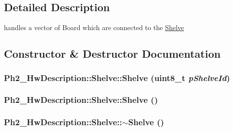 \subsection{Detailed Description}
handles a vector of Board which are connected to the \hyperlink{class_ph2___hw_description_1_1_shelve}{Shelve} 



\subsection{Constructor \& Destructor Documentation}
\hypertarget{class_ph2___hw_description_1_1_shelve_7e0361665ca7e4de8ce3fd1138ad1d86}{
\subsubsection[Shelve]{\setlength{\rightskip}{0pt plus 5cm}Ph2\_\-Hw\-Description::Shelve::Shelve (uint8\_\-t {\em p\-Shelve\-Id})}}
\label{class_ph2___hw_description_1_1_shelve_7e0361665ca7e4de8ce3fd1138ad1d86}


\hypertarget{class_ph2___hw_description_1_1_shelve_b989c28364f9f94029dd02b3eb1d8241}{
\subsubsection[Shelve]{\setlength{\rightskip}{0pt plus 5cm}Ph2\_\-Hw\-Description::Shelve::Shelve ()}}
\label{class_ph2___hw_description_1_1_shelve_b989c28364f9f94029dd02b3eb1d8241}


\hypertarget{class_ph2___hw_description_1_1_shelve_cbdc580d3ff8f4efe2df84d19ef6ef55}{
\subsubsection[$\sim$Shelve]{\setlength{\rightskip}{0pt plus 5cm}Ph2\_\-Hw\-Description::Shelve::$\sim$Shelve ()}}
\label{class_ph2___hw_description_1_1_shelve_cbdc580d3ff8f4efe2df84d19ef6ef55}




